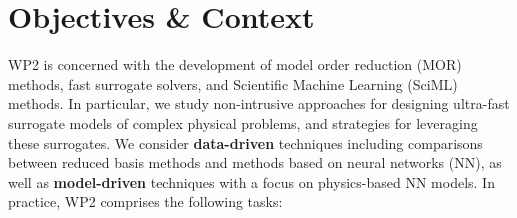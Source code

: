 
\section{Objectives \& Context}

WP2 is concerned with the development of model order reduction (MOR)
methods, fast surrogate solvers, and Scientific Machine Learning
(SciML) methods. In particular, we study non-intrusive approaches for
designing ultra-fast surrogate models of complex physical problems,
and strategies for leveraging these surrogates. We consider {\bf
  data-driven} techniques including comparisons between reduced basis
methods and methods based on neural networks (NN), as well as {\bf
  model-driven} techniques with a focus on physics-based NN models.
In practice, WP2 comprises the following tasks:
